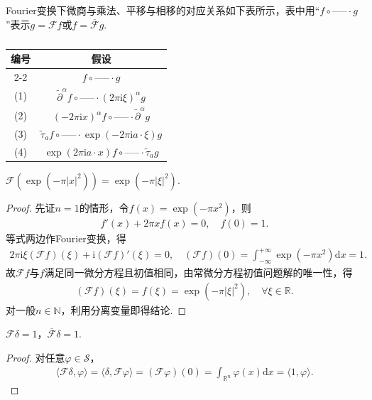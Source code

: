 \documentclass[../../main.tex]{subfiles}%
\begin{document}
\begin{remark}
Fourier变换下微商与乘法、平移与相移的对应关系如下表所示，表中用“$f \circ \text{-----} \cdot g$”表示$g=\mathscr{F}f$或$f=\overline{\mathscr{F}}g$.
\begin{table}[H]
\centering
\caption{}
\begin{tabular}{c|c}
\hline
编号 & 假设 \\
\cline{2-2}
& $f \circ \text{-----} \cdot g$ \\
\hline
(1) & $\widetilde{\partial}^\alpha f \circ \text{-----} \cdot (2\pi\mathrm{i}\xi)^\alpha g$ \\
\hline
(2) & $(-2\pi\mathrm{i}x)^\alpha f \circ \text{-----} \cdot \widetilde{\partial}^\alpha g$ \\
\hline
(3) & $\widetilde{\tau}_a f \circ \text{-----} \cdot \exp(-2\pi\mathrm{i}a\cdot\xi)g$ \\
\hline
(4) & $\exp(2\pi\mathrm{i}a\cdot x)f \circ \text{-----} \cdot \widetilde{\tau}_a g$ \\
\hline
\end{tabular}
\end{table}

\end{remark}

\begin{proposition}
$\mathscr{F}(\exp(-\pi|x|^2))=\exp(-\pi|\xi|^2)$.
\end{proposition}
\begin{proof}
先证$n=1$的情形，令$f(x)=\exp(-\pi x^2)$，则
\begin{align*}
f'(x)+2\pi x f(x)=0,\quad f(0)=1.
\end{align*}
等式两边作Fourier变换，得
\begin{align*}
2\pi\mathrm{i}\xi(\mathscr{F}f)(\xi)+\mathrm{i}(\mathscr{F}f)'(\xi)=0,\quad (\mathscr{F}f)(0)=\int_{-\infty}^{+\infty}\exp(-\pi x^2)\mathrm{d}x=1.
\end{align*}
故$\mathscr{F}f$与$f$满足同一微分方程且初值相同，由常微分方程初值问题解的唯一性，得
\begin{align*}
(\mathscr{F}f)(\xi)=f(\xi)=\exp(-\pi|\xi|^2),\quad \forall\xi\in\mathbb{R}.
\end{align*}
对一般$n\in\mathbb{N}$，利用分离变量即得结论.
\end{proof}

\begin{proposition}
$\mathscr{F}\delta=1$，$\overline{\mathscr{F}}\delta=1$.
\end{proposition}
\begin{proof}
对任意$\varphi\in\mathscr{S}$，
\begin{align*}
\langle\mathscr{F}\delta,\varphi\rangle=\langle\delta,\mathscr{F}\varphi\rangle=(\mathscr{F}\varphi)(0)=\int_{\mathbb{R}^n}\varphi(x)\mathrm{d}x=\langle1,\varphi\rangle.
\end{align*}
\end{proof}
\end{document}
